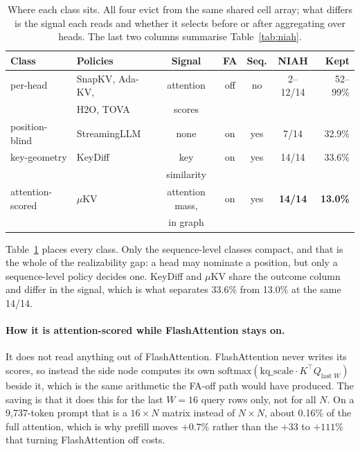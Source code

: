 \documentclass[11pt]{article}
\begin{document}
\begin{table}[h]\centering\small
\caption{Where each class sits. All four evict from the same shared cell array; what differs
is the signal each reads and whether it selects before or after aggregating over heads. The
last two columns summarise Table~\ref{tab:niah}.}
\label{tab:classes}
\begin{tabular}{@{}llccccr@{}}
\toprule
\textbf{Class} & \textbf{Policies} & \textbf{Signal} & \textbf{FA} &
\textbf{Seq.} & \textbf{NIAH} & \textbf{Kept}\\
\midrule
per-head        & SnapKV, Ada-KV,      & attention    & off & no  & 2--12/14 & 52--99\%\\
                & H2O, TOVA            & scores       &     &     &          &         \\
position-blind  & StreamingLLM         & none         & on  & yes & 7/14     & 32.9\%\\
key-geometry    & KeyDiff              & key          & on  & yes & 14/14    & 33.6\%\\
                &                      & similarity   &     &     &          &         \\
\rowcolor{cA!8} attention-scored & $\mu$KV & attention mass, & on & yes & \textbf{14/14} & \textbf{13.0\%}\\
\rowcolor{cA!8}                  &         & in graph        &    &     &                &        \\
\bottomrule
\end{tabular}
\end{table}

\noindent Table~\ref{tab:classes} places every class. Only the sequence-level classes compact, and that is the whole of the realizability
gap: a head may nominate a position, but only a sequence-level policy decides one. KeyDiff and
$\mu$KV share the outcome column and differ in the signal, which is what separates 33.6\% from
13.0\% at the same 14/14.

\paragraph{How it is attention-scored while FlashAttention stays on.} It does not read
anything out of FlashAttention. FlashAttention never writes its scores, so instead the side
node computes its own $\mathrm{softmax}(\text{kq\_scale}\cdot K^{\top}Q_{\text{last }W})$
beside it, which is the same arithmetic the FA-off path would have produced. The saving is
that it does this for the last $W{=}16$ query rows only, not for all $N$. On a 9{,}737-token
prompt that is a $16\times N$ matrix instead of $N\times N$, about 0.16\% of the full
attention, which is why prefill moves $+0.7\%$ rather than the $+33$ to $+111\%$ that turning
FlashAttention off costs.
\end{document}
